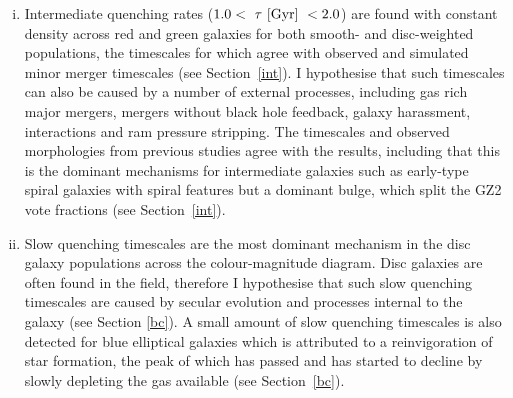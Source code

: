 \begin{enumerate}[(i)]
\item Intermediate quenching rates ($1.0 < ~\tau~\rm{[Gyr]}~ < 2.0 $) are found with constant density across red and green galaxies for both smooth- and disc-weighted populations, the timescales for which agree with observed and simulated minor merger timescales (see Section~\ref{int}). I hypothesise that such timescales can also be caused by a number of external processes, including gas rich major mergers, mergers without black hole feedback, galaxy harassment, interactions and ram pressure stripping. The timescales and observed morphologies from previous studies agree with the results, including that this is the dominant mechanisms for intermediate galaxies such as early-type spiral galaxies with spiral features but a dominant bulge, which split the GZ2 vote fractions (see Section~\ref{int}). 

\item Slow quenching timescales are the most dominant mechanism in the disc galaxy populations across the colour-magnitude diagram. Disc galaxies are often found in the field, therefore I hypothesise that such slow quenching timescales are caused by secular evolution and processes internal to the galaxy (see Section \ref{bc}). A small amount of slow quenching timescales is also detected for blue elliptical galaxies which is attributed to a reinvigoration of star formation, the peak of which has passed and has started to decline by slowly depleting the gas available (see Section~\ref{bc}). 
\end{enumerate}
